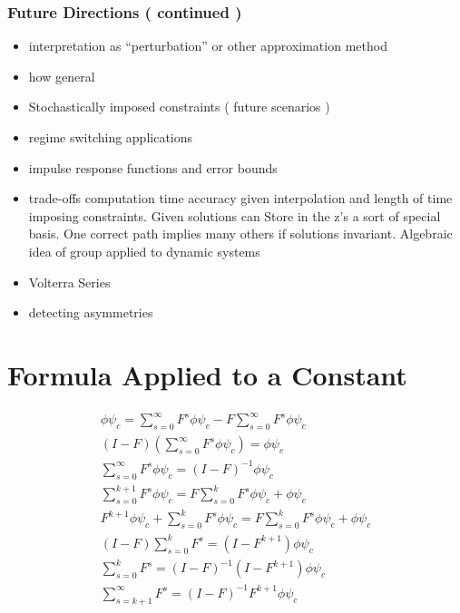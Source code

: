 \documentclass{beamer}
\begin{document}
   \begin{frame}
     \frametitle{Future Directions ( continued )}
     \begin{itemize}
\item interpretation as ``perturbation'' or other approximation method
\item how general
\item Stochastically imposed constraints ( future scenarios )
\item regime switching applications
\item impulse response functions and error bounds
\item trade-offs computation time accuracy given interpolation and length of time imposing constraints.  Given solutions can Store in the z's a sort of special basis. One correct path implies many others if solutions invariant.   Algebraic idea of group applied to dynamic systems
\item Volterra Series
\item detecting asymmetries
     \end{itemize}
   \end{frame}
   \begin{frame}
 
 
     
   \end{frame}






\newpage
\section{Formula Applied to a Constant}
{\tiny
\begin{gather*}
\phi \psi_c=  \sum_{s=0}^\infty F^s \phi \psi_c  -   F \sum_{s=0}^\infty F^s \phi \psi_c \\
(I-F) \left (\sum_{s=0}^\infty F^s \phi \psi_c \right ) =\phi \psi_c\\
\sum_{s=0}^\infty F^s \phi \psi_c=(I - F)^{-1}\phi \psi_c\\
\sum_{s=0}^{k+1} F^s \phi \psi_c=F \sum_{s=0}^{k} F^s \phi \psi_c + \phi \psi_c\\
F^{k+1} \phi \psi_c +\sum_{s=0}^{k} F^s \phi \psi_c=F \sum_{s=0}^{k} F^s \phi \psi_c + \phi \psi_c\\
(I -F)\sum_{s=0}^{k} F^s  = (I- F^{k+1}) \phi \psi_c\\
\sum_{s=0}^{k} F^s  = (I -F)^{-1}(I- F^{k+1}) \phi \psi_c\\
\sum_{s=k+1}^{\infty} F^s  = (I -F)^{-1} F^{k+1}\phi \psi_c
\end{gather*}
}
\end{document}

